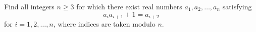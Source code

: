 Find all integers $n \geq 3$ for which
there exist real numbers $a_1, a_2, \dots, a_n$ satisfying
\[ a_i a_{i+1} +1 = a_{i+2} \]
for $i=1,2, \dots, n$, where indices are taken modulo $n$.